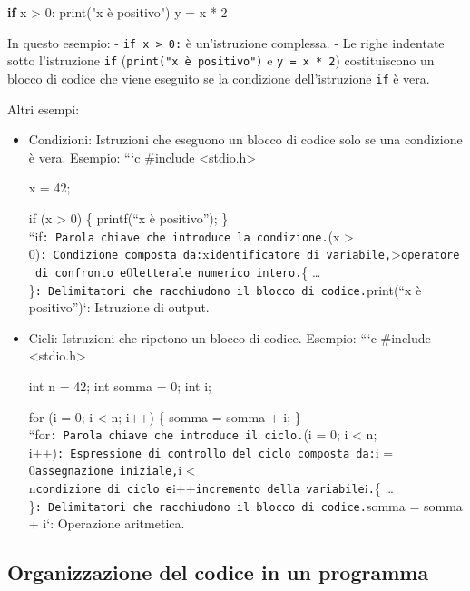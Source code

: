 \documentclass[
  letterpaper,
  DIV=11,
  numbers=noendperiod]{scrreprt}
\newenvironment{Shaded}{\begin{snugshade}}{\end{snugshade}}
\newcommand{\BuiltInTok}[1]{\textcolor[rgb]{0.00,0.23,0.31}{#1}}
\newcommand{\ControlFlowTok}[1]{\textcolor[rgb]{0.00,0.23,0.31}{\textbf{#1}}}
\newcommand{\DecValTok}[1]{\textcolor[rgb]{0.68,0.00,0.00}{#1}}
\newcommand{\NormalTok}[1]{\textcolor[rgb]{0.00,0.23,0.31}{#1}}
\newcommand{\OperatorTok}[1]{\textcolor[rgb]{0.37,0.37,0.37}{#1}}
\newcommand{\StringTok}[1]{\textcolor[rgb]{0.13,0.47,0.30}{#1}}
\begin{document}
\begin{Shaded}
\begin{Highlighting}[]
  \ControlFlowTok{if}\NormalTok{ x }\OperatorTok{\textgreater{}} \DecValTok{0}\NormalTok{:}
      \BuiltInTok{print}\NormalTok{(}\StringTok{"x è positivo"}\NormalTok{)}
\NormalTok{      y }\OperatorTok{=}\NormalTok{ x }\OperatorTok{*} \DecValTok{2}
\end{Highlighting}
\end{Shaded}

In questo esempio: - \texttt{if\ x\ \textgreater{}\ 0:} è un'istruzione
complessa. - Le righe indentate sotto l'istruzione \texttt{if}
(\texttt{print("x\ è\ positivo")} e \texttt{y\ =\ x\ *\ 2})
costituiscono un blocco di codice che viene eseguito se la condizione
dell'istruzione \texttt{if} è vera.

Altri esempi:

\begin{itemize}
\item
  Condizioni: Istruzioni che eseguono un blocco di codice solo se una
  condizione è vera. Esempio: ```c \#include
  \textless stdio.h\textgreater{}

  x = 42;

  if (x \textgreater{} 0) \{ printf(``x è positivo\n''); \}
  ``\texttt{}if\texttt{:\ Parola\ chiave\ che\ introduce\ la\ condizione.}(x
  \textgreater{}
  0)\texttt{:\ Condizione\ composta\ da:}x\texttt{identificatore\ di\ variabile,}\textgreater{}\texttt{operatore\ di\ confronto\ e}0\texttt{letterale\ numerico\ intero.}\{
  \ldots{}
  \}\texttt{:\ Delimitatori\ che\ racchiudono\ il\ blocco\ di\ codice.}print(``x
  è positivo'')`: Istruzione di output.
\item
  Cicli: Istruzioni che ripetono un blocco di codice. Esempio: ```c
  \#include \textless stdio.h\textgreater{}

  int n = 42; int somma = 0; int i;

  for (i = 0; i \textless{} n; i++) \{ somma = somma + i; \}
  ``\texttt{}for\texttt{:\ Parola\ chiave\ che\ introduce\ il\ ciclo.}(i
  = 0; i \textless{} n;
  i++)\texttt{:\ Espressione\ di\ controllo\ del\ ciclo\ composta\ da:}i
  = 0\texttt{assegnazione\ iniziale,}i \textless{}
  n\texttt{condizione\ di\ ciclo\ e}i++\texttt{incremento\ della\ variabile}i\texttt{.}\{
  \ldots{}
  \}\texttt{:\ Delimitatori\ che\ racchiudono\ il\ blocco\ di\ codice.}somma
  = somma + i`: Operazione aritmetica.
\end{itemize}

\subsection{Organizzazione del codice in un
programma}\label{organizzazione-del-codice-in-un-programma}
\end{document}

